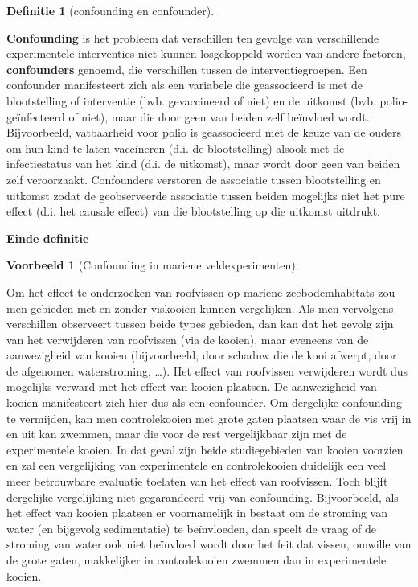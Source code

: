 \documentclass[
  12pt,dutch,coursenotes]{book}
\theoremstyle{definition}
\newtheorem{definition}{Definitie}[chapter]
\theoremstyle{definition}
\newtheorem{example}{Voorbeeld}[chapter]
\theoremstyle{definition}
\theoremstyle{definition}
\theoremstyle{remark}
\begin{document}
\begin{definition}[confounding en confounder]
\protect\hypertarget{def:unnamed-chunk-67}{}{\label{def:unnamed-chunk-67} {} }
\end{definition}
\textbf{Confounding} is het probleem dat verschillen ten gevolge van verschillende experimentele interventies niet kunnen losgekoppeld worden van andere factoren, \textbf{confounders} genoemd, die verschillen tussen de interventiegroepen. Een confounder manifesteert zich als een variabele die geassocieerd
is met de blootstelling of interventie (bvb. gevaccineerd of niet) en de uitkomst (bvb.
polio-geïnfecteerd of niet), maar die door geen van beiden zelf beïnvloed wordt. Bijvoorbeeld, vatbaarheid voor polio is geassocieerd met de
keuze van de ouders om hun kind te laten vaccineren (d.i. de blootstelling)
alsook met de infectiestatus van het kind (d.i. de uitkomst), maar wordt
door geen van beiden zelf veroorzaakt. Confounders verstoren de associatie
tussen blootstelling en uitkomst zodat de geobserveerde associatie tussen
beiden mogelijks niet het pure effect (d.i. het causale effect) van die
blootstelling op die uitkomst uitdrukt.

\textbf{Einde definitie}

\begin{example}[Confounding in mariene veldexperimenten]
\protect\hypertarget{exm:unnamed-chunk-68}{}{\label{exm:unnamed-chunk-68} {} }
\end{example}
Om het effect te onderzoeken van roofvissen op mariene zeebodemhabitats zou men gebieden met en zonder viskooien kunnen vergelijken. Als men vervolgens verschillen observeert tussen beide types gebieden, dan kan dat het gevolg zijn van het verwijderen van roofvissen (via de kooien), maar eveneens van de aanwezigheid van kooien (bijvoorbeeld, door schaduw die de kooi afwerpt, door de afgenomen waterstroming, \ldots). Het effect van roofvissen verwijderen wordt dus mogelijks verward met het effect van kooien plaatsen. De aanwezigheid van kooien manifesteert zich hier dus als een confounder. Om dergelijke confounding te vermijden, kan men controlekooien met grote gaten plaatsen waar de vis vrij in en uit kan zwemmen, maar die voor de rest vergelijkbaar zijn met de experimentele kooien. In dat geval zijn beide studiegebieden van kooien voorzien en zal een vergelijking van experimentele en controlekooien duidelijk een veel meer betrouwbare evaluatie toelaten van het effect van roofvissen. Toch blijft dergelijke vergelijking niet gegarandeerd vrij van confounding. Bijvoorbeeld, als het effect van kooien plaatsen er voornamelijk in bestaat om de stroming van water (en bijgevolg sedimentatie) te beïnvloeden, dan speelt de vraag of de stroming van water ook niet beïnvloed wordt door het feit dat vissen, omwille van de grote gaten, makkelijker in controlekooien zwemmen dan in experimentele kooien.
\end{document}
